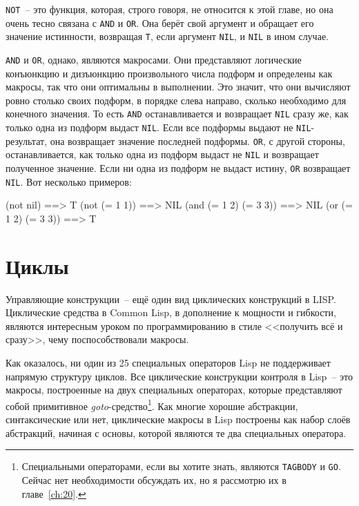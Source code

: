 \lstinline{NOT}~-- это функция, которая, строго говоря, не относится к этой главе, но она очень
тесно связана с \lstinline{AND} и \lstinline{OR}. Она берёт свой аргумент и обращает его значение
истинности, возвращая \lstinline{T}, если аргумент \lstinline{NIL}, и \lstinline{NIL} в ином случае.

\lstinline{AND} и \lstinline{OR}, однако, являются макросами. Они представляют логические конъюнкцию
и дизъюнкцию произвольного числа подформ и определены как макросы, так что они оптимальны
в выполнении. Это значит, что они вычисляют ровно столько своих подформ, в порядке слева
направо, сколько необходимо для конечного значения. То есть \lstinline{AND} останавливается и
возвращает \lstinline{NIL} сразу же, как только одна из подформ выдаст \lstinline{NIL}. Если все
подформы выдают не \lstinline{NIL}-результат, она возвращает значение последней
подформы. \lstinline{OR}, с другой стороны, останавливается, как только одна из подформ выдаст
не \lstinline{NIL} и возвращает полученное значение. Если ни одна из подформ не выдаст истину,
\lstinline{OR} возвращает \lstinline{NIL}. Вот несколько примеров:

\begin{myverb}
(not nil)             ==> T
(not (= 1 1))         ==> NIL
(and (= 1 2) (= 3 3)) ==> NIL
(or (= 1 2) (= 3 3))  ==> T
\end{myverb}

\section{Циклы}

Управляющие конструкции~-- ещё один вид циклических конструкций в LISP. Циклические средства в Common Lisp, в дополнение к
мощности и гибкости, являются интересным уроком по программированию в стиле <<получить всё
и сразу>>, чему поспособствовали макросы.

Как оказалось, ни один из 25 специальных операторов Lisp не поддерживает напрямую
структуру циклов. Все циклические конструкции контроля в Lisp~-- это макросы, построенные
на двух специальных операторах, которые представляют собой примитивное
\textit{goto}-средство\footnote{Специальными операторами, если вы хотите знать, являются
  \lstinline{TAGBODY} и \lstinline{GO}. Сейчас нет необходимости обсуждать их, но я рассмотрю их в
  главе~\ref{ch:20}.}\hspace{\footnotenegspace}.  Как многие хорошие абстракции, синтаксические или нет, циклические
макросы в Lisp построены как набор слоёв абстракций, начиная с основы, которой являются те
два специальных оператора.

